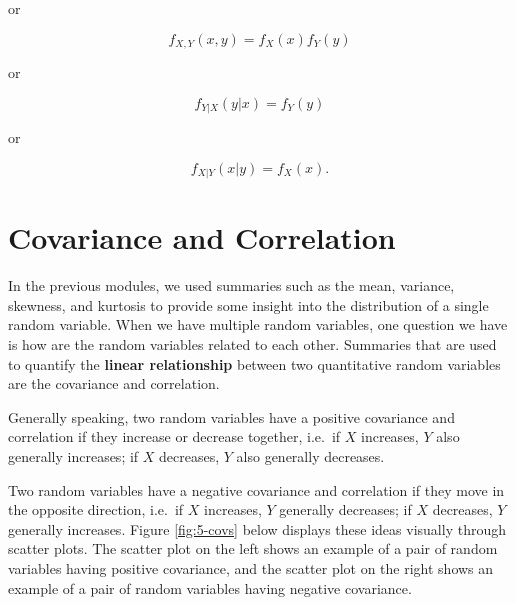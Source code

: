 \documentclass[
]{book}
\begin{document}
or

\begin{equation} 
f_{X,Y} (x,y) = f_X(x) f_Y(y)
\label{eq:5-indcont2}
\end{equation}

or

\begin{equation} 
f_{Y|X} (y|x) = f_Y(y)
\label{eq:5-indcont3}
\end{equation}

or

\begin{equation} 
f_{X|Y} (x|y) = f_X(x).
\label{eq:5-indcont4}
\end{equation}

\hypertarget{covcorr}{%
\section{Covariance and Correlation}\label{covcorr}}

In the previous modules, we used summaries such as the mean, variance, skewness, and kurtosis to provide some insight into the distribution of a single random variable. When we have multiple random variables, one question we have is how are the random variables related to each other. Summaries that are used to quantify the \textbf{linear relationship} between two quantitative random variables are the covariance and correlation.

Generally speaking, two random variables have a positive covariance and correlation if they increase or decrease together, i.e.~if \(X\) increases, \(Y\) also generally increases; if \(X\) decreases, \(Y\) also generally decreases.

Two random variables have a negative covariance and correlation if they move in the opposite direction, i.e.~if \(X\) increases, \(Y\) generally decreases; if \(X\) decreases, \(Y\) generally increases. Figure \ref{fig:5-covs} below displays these ideas visually through scatter plots. The scatter plot on the left shows an example of a pair of random variables having positive covariance, and the scatter plot on the right shows an example of a pair of random variables having negative covariance.
\end{document}
